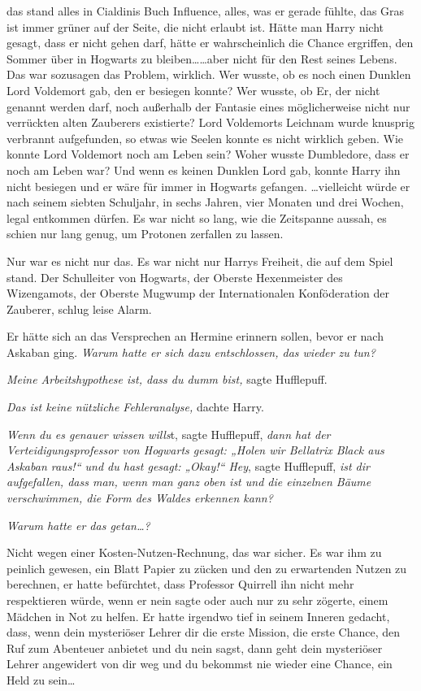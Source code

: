 {das stand alles in Cialdinis Buch Influence, alles, was er gerade fühlte, das Gras ist immer grüner auf der Seite, die nicht erlaubt ist. Hätte man Harry nicht gesagt, dass er nicht gehen darf, hätte er wahrscheinlich die Chance ergriffen, den Sommer über in Hogwarts zu bleiben……aber nicht für den Rest seines Lebens. Das war sozusagen das Problem, wirklich. Wer wusste, ob es noch einen Dunklen Lord Voldemort gab, den er besiegen konnte? Wer wusste, ob Er, der nicht genannt werden darf, noch außerhalb der Fantasie eines möglicherweise nicht nur verrückten alten Zauberers existierte? Lord Voldemorts Leichnam wurde knusprig verbrannt aufgefunden, so etwas wie Seelen konnte es nicht wirklich geben. Wie konnte Lord Voldemort noch am Leben sein? Woher wusste Dumbledore, dass er noch am Leben war? Und wenn es keinen Dunklen Lord gab, konnte Harry ihn nicht besiegen und er wäre für immer in Hogwarts gefangen. …vielleicht würde er nach seinem siebten Schuljahr, in sechs Jahren, vier Monaten und drei Wochen, legal entkommen dürfen. Es war nicht so lang, wie die Zeitspanne aussah, es schien nur lang genug, um Protonen zerfallen zu lassen.

Nur war es nicht nur das. Es war nicht nur Harrys Freiheit, die auf dem Spiel stand. Der Schulleiter von Hogwarts, der Oberste Hexenmeister des Wizengamots, der Oberste Mugwump der Internationalen Konföderation der Zauberer, schlug leise Alarm.

Er hätte sich an das Versprechen an Hermine erinnern sollen, bevor er nach Askaban ging. \emph{Warum hatte er sich dazu entschlossen, das wieder zu tun?}

\emph{Meine Arbeitshypothese ist, dass du dumm bist,} sagte Hufflepuff.

\emph{Das ist keine nützliche Fehleranalyse,} dachte Harry.

\emph{Wenn du es genauer wissen wills}t, sagte Hufflepuff, \emph{dann hat der Verteidigungsprofessor von Hogwarts gesagt: „Holen wir Bellatrix Black aus Askaban raus!“ und du hast gesagt: „Okay!“ Hey}, sagte Hufflepuff, \emph{ist dir aufgefallen, dass man, wenn man ganz oben ist und die einzelnen Bäume verschwimmen, die Form des Waldes erkennen kann?}

\emph{Warum hatte er das getan…?}

Nicht wegen einer Kosten-Nutzen-Rechnung, das war sicher. Es war ihm zu peinlich gewesen, ein Blatt Papier zu zücken und den zu erwartenden Nutzen zu berechnen, er hatte befürchtet, dass Professor Quirrell ihn nicht mehr respektieren würde, wenn er nein sagte oder auch nur zu sehr zögerte, einem Mädchen in Not zu helfen. Er hatte irgendwo tief in seinem Inneren gedacht, dass, wenn dein mysteriöser Lehrer dir die erste Mission, die erste Chance, den Ruf zum Abenteuer anbietet und du nein sagst, dann geht dein mysteriöser Lehrer angewidert von dir weg und du bekommst nie wieder eine Chance, ein Held zu sein…

}
